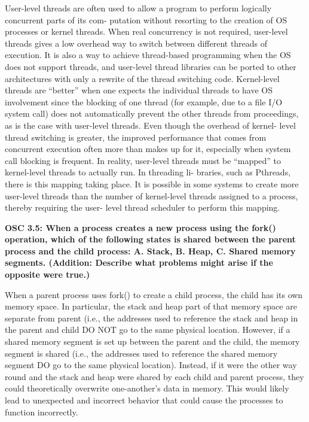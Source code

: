 \documentclass[8pt,landscape]{article}
\begin{document}
\begin{multicols}{3}
\begin{tiny}
User-level threads are often used to allow a program to perform logically concurrent parts of its com-
putation without resorting to the creation of OS processes or kernel threads.  When real concurrency is not
required, user-level threads gives a low overhead way to switch between different threads of execution.  It
is also a way to achieve thread-based programming when the OS does not support threads, and user-level
thread libraries can be ported to other architectures with only a rewrite of the thread switching code.
Kernel-level threads are “better” when one expects the individual threads to have OS involvement since
the blocking of one thread (for example, due to a file I/O system call) does not automatically prevent the
other threads from proceedings, as is the case with user-level threads. Even though the overhead of kernel-
level thread switching is greater,  the improved performance that comes from concurrent execution often
more than makes up for it, especially when system call blocking is frequent.
In reality, user-level threads must be “mapped” to kernel-level threads to actually run.  In threading li-
braries, such as Pthreads, there is this mapping taking place.  It is possible in some systems to create more
user-level threads than the number of kernel-level threads assigned to a process, thereby requiring the user-
level thread scheduler to perform this mapping.

\textbf{OSC 3.5: When a process creates a new process using the
fork() operation, which of the following states
is shared between the parent process and the child process: A. Stack, B. Heap, C. Shared memory segments.
(Addition: Describe what problems might arise if the opposite were true.)}

When a parent process uses
fork()
to create a child process, the child has its own memory space.
In particular, the stack and heap part of that memory space are separate from parent (i.e., the addresses used
to reference the stack and heap in the parent and child DO NOT go to the same physical location. However,
if a shared memory segment is set up between the parent and the child, the memory segment is shared (i.e.,
the addresses used to reference the shared memory segment DO go to the same physical location). Instead, if
it were the other way round and the stack and heap were shared by each child and parent process, they could
theoretically overwrite one-another’s data in memory.  This would likely lead to unexpected and incorrect
behavior that could cause the processes to function incorrectly.


\end{tiny}
\end{multicols}
\end{document}
